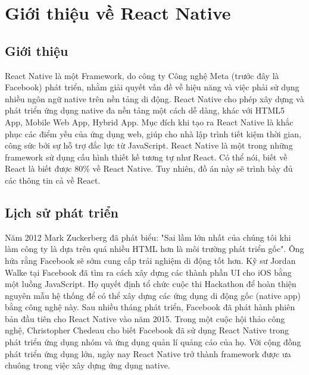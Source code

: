 \section{Giới thiệu về React Native}

\subsection{Giới thiệu}
React Native là một Framework, do công ty Công nghệ Meta (trước đây là Facebook) phát triển, nhằm giải quyết vấn đề về hiệu năng và việc phải sử dụng nhiều ngôn ngữ native trên nền tảng di động.
\newline
React Native cho phép xây dựng và phát triển ứng dụng native đa nền tảng một cách dễ dàng, khác với HTML5 App, Mobile Web App, Hybrid App. Mục đích khi tạo ra React Native là khắc phục các điểm yếu của ứng dụng web, giúp cho nhà lập trình tiết kiệm thời gian, công sức bởi sự hỗ trợ đắc lực từ JavaScript.
\newline
React Native là một trong những framework sử dụng cấu hình thiết kế tương tự như React. Có thể nói, biết về React là biết được 80\% về React Native. Tuy nhiên, đồ án này sẽ trình bày đủ các thông tin cả về React.

\subsection{Lịch sử phát triển}
Năm 2012 Mark Zuckerberg đã phát biểu: "Sai lầm lớn nhất của chúng tôi khi làm công ty là dựa trên quá nhiều HTML hơn là môi trường phát triển gốc". Ông hứa rằng Facebook sẽ sớm cung cấp trải nghiệm di động tốt hơn.
\newline
Kỹ sư Jordan Walke tại Facebook đã tìm ra cách xây dựng các thành phần UI cho iOS bằng một luồng JavaScript. Họ quyết định tổ chức cuộc thi Hackathon để hoàn thiện nguyên mẫu hệ thống để có thể xây dựng các ứng dụng di động gốc (native app) bằng công nghệ này.
\newline
Sau nhiều tháng phát triển, Facebook đã phát hành phiên bản đầu tiên cho React Native vào năm 2015. Trong một cuộc hội thảo công nghệ, Christopher Chedeau cho biết Facebook đã sử dụng React Native trong phát triển ứng dụng nhóm và ứng dụng quản lí quảng cáo của họ.
\newline
Với cộng đồng phát triển ứng dụng lớn, ngày nay React Native trở thành framework được ưa chuông trong việc xây dựng ứng dụng native.

